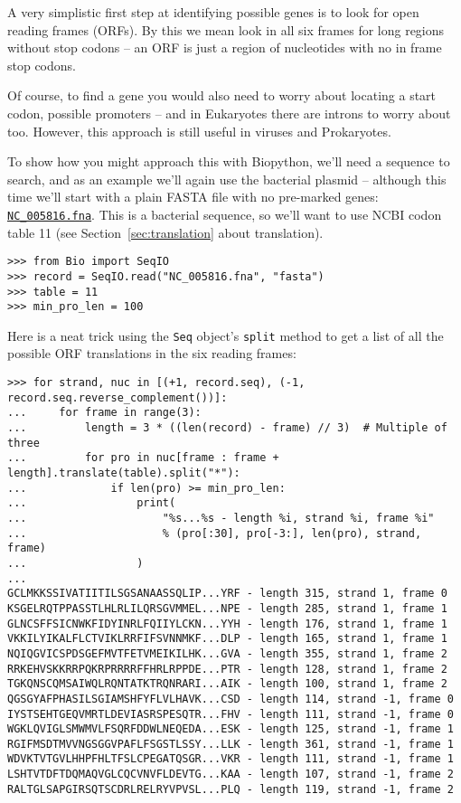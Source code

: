 A very simplistic first step at identifying possible genes is to look for
open reading frames (ORFs).  By this we mean look in all six frames for long
regions without stop codons -- an ORF is just a region of nucleotides with
no in frame stop codons.

Of course, to find a gene you would also need to worry about locating a start
codon, possible promoters -- and in Eukaryotes there are introns to worry about
too.  However, this approach is still useful in viruses and Prokaryotes.

To show how you might approach this with Biopython, we'll need a sequence to
search, and as an example we'll again use the bacterial plasmid -- although
this time we'll start with a plain FASTA file with no pre-marked genes:
\href{https://raw.githubusercontent.com/biopython/biopython/master/Tests/GenBank/NC_005816.fna}
{\texttt{NC\_005816.fna}}. This is a bacterial sequence, so we'll want to use
NCBI codon table 11 (see Section~\ref{sec:translation} about translation).

\begin{verbatim}
>>> from Bio import SeqIO
>>> record = SeqIO.read("NC_005816.fna", "fasta")
>>> table = 11
>>> min_pro_len = 100
\end{verbatim}

Here is a neat trick using the \verb|Seq| object's \verb|split| method to
get a list of all the possible ORF translations in the six reading frames:

\begin{verbatim}
>>> for strand, nuc in [(+1, record.seq), (-1, record.seq.reverse_complement())]:
...     for frame in range(3):
...         length = 3 * ((len(record) - frame) // 3)  # Multiple of three
...         for pro in nuc[frame : frame + length].translate(table).split("*"):
...             if len(pro) >= min_pro_len:
...                 print(
...                     "%s...%s - length %i, strand %i, frame %i"
...                     % (pro[:30], pro[-3:], len(pro), strand, frame)
...                 )
...
GCLMKKSSIVATIITILSGSANAASSQLIP...YRF - length 315, strand 1, frame 0
KSGELRQTPPASSTLHLRLILQRSGVMMEL...NPE - length 285, strand 1, frame 1
GLNCSFFSICNWKFIDYINRLFQIIYLCKN...YYH - length 176, strand 1, frame 1
VKKILYIKALFLCTVIKLRRFIFSVNNMKF...DLP - length 165, strand 1, frame 1
NQIQGVICSPDSGEFMVTFETVMEIKILHK...GVA - length 355, strand 1, frame 2
RRKEHVSKKRRPQKRPRRRRFFHRLRPPDE...PTR - length 128, strand 1, frame 2
TGKQNSCQMSAIWQLRQNTATKTRQNRARI...AIK - length 100, strand 1, frame 2
QGSGYAFPHASILSGIAMSHFYFLVLHAVK...CSD - length 114, strand -1, frame 0
IYSTSEHTGEQVMRTLDEVIASRSPESQTR...FHV - length 111, strand -1, frame 0
WGKLQVIGLSMWMVLFSQRFDDWLNEQEDA...ESK - length 125, strand -1, frame 1
RGIFMSDTMVVNGSGGVPAFLFSGSTLSSY...LLK - length 361, strand -1, frame 1
WDVKTVTGVLHHPFHLTFSLCPEGATQSGR...VKR - length 111, strand -1, frame 1
LSHTVTDFTDQMAQVGLCQCVNVFLDEVTG...KAA - length 107, strand -1, frame 2
RALTGLSAPGIRSQTSCDRLRELRYVPVSL...PLQ - length 119, strand -1, frame 2
\end{verbatim}

